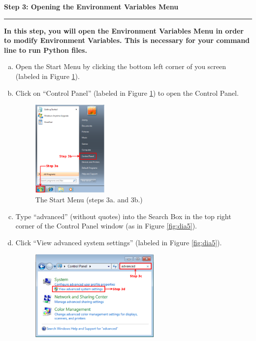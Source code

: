 \documentclass[11pt,english]{article}
\newcommand{\myhrule}{\vspace{0.3cm}\hrule\vspace{0.3cm}}
\begin{document}
\newpage
{\Large {\bf Step 3: Opening the Environment Variables Menu}}
\myhrule
{\bf In this step, you will open the Environment Variables Menu in order to
modify Environment Variables. This is necessary for your command line to
run Python files.}
\begin{enumerate}[a.]
\item Open the Start Menu by clicking the bottom left corner of you screen
(labeled in Figure \ref{fig:dia4}).
\item Click on ``Control Panel'' (labeled in Figure \ref{fig:dia4}) to open
the Control Panel.
\begin{figure}[h]
\begin{center}
\includegraphics[width=0.35\textwidth]{dia4}
\end{center}
\vspace{-0.5cm}
\caption{The Start Menu (steps 3a. and 3b.)}
\label{fig:dia4}
\end{figure}
\item Type ``advanced'' (without quotes) into the Search Box in the top right
corner of the Control Panel window (as in Figure \ref{fig:dia5}).
\item Click ``View advanced system settings'' (labeled in Figure
\ref{fig:dia5}).
\begin{figure}[h]
\begin{center}
\includegraphics[width=0.6\textwidth]{dia5}
\end{center}

\end{figure}
\end{enumerate}
\end{document}
